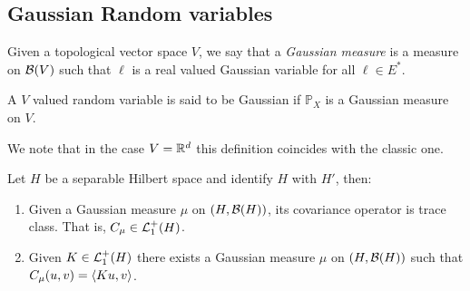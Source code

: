 \documentclass[
    a4paper,
    DIV=14,
    abstract=true,
    numbers=noenddot
]{scrartcl}
\begin{document}
\subsection{Gaussian Random variables}
\begin{definition}
	Given a topological vector space $V$, we say that a \emph{Gaussian measure } is a measure on $\mathcal{B}(V)$ such that $\ell $ is a real valued Gaussian variable for all $\ell \in E^*$.
\end{definition}
\begin{definition}
	A $V$ valued random variable is said to be Gaussian if $\mathbb{P}_X$ is a Gaussian measure on $V$.
\end{definition}
We note that in the case $V=\mathbb{R}^d$ this definition coincides with the classic one.
\begin{proposition}\label{covarianceariance kernel gaussian} Let $H$ be a separable Hilbert space and identify  $H$ with $H'$, then:
	\begin{enumerate}
		\item Given a Gaussian measure $\mu $ on  $(H,\mathcal{B}(H))$, its covariance operator is trace class. That is, $C_\mu \in \mathcal{L}_1^+(H)$.
		\item Given $K\in \mathcal{L}_1^+(H)$ there exists a Gaussian measure $\mu $ on $(H,\mathcal{B}(H))$ such that $C_\mu(u,v)=\left\langle Ku ,v\right\rangle$.
	\end{enumerate}
\end{proposition}
\end{document}
